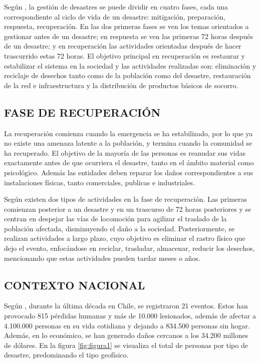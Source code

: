 \documentclass[12pt,a4paper]{article}
\begin{document}
Según \citet{celik}, la gestión de desastres se puede dividir en cuatro fases, cada una correspondiente al ciclo de vida de un desastre: mitigación, preparación, respuesta, recuperación. En las dos primeras fases se ven los temas orientados a gestionar antes de un desastre; en respuesta se ven las primeras 72 horas después de un desastre; y en recuperación las actividades orientadas después de hacer trascurrido estas 72 horas. El objetivo principal en recuperación es restaurar y estabilizar el sistema en la sociedad y las actividades realizadas son: eliminación y reciclaje de desechos tanto como de la población como del desastre, restauración de la red e infraestructura y la distribución de productos básicos de socorro.

\subsection{FASE DE RECUPERACIÓN}

La recuperación comienza cuando la emergencia se ha estabilizado, por lo que ya no existe una amenaza latente a la población, y termina cuando la comunidad se ha recuperado. El objetivo de la mayoría de las personas es reanudar sus vidas exactamente antes de que ocurriera el desastre, tanto en el ámbito material como psicológico. Además las entidades deben reparar los daños correspondientes a sus instalaciones físicas, tanto comerciales, publicas e industriales\citep{lindell2006wiley}.

Según \citet{Feng2003} existen dos tipos de actividades en la fase de recuperación. Las primeras comienzan posterior a un desastre y en un trascurso de 72 horas posteriores y se centran en despejar las vías de locomoción para agilizar el traslado de la población afectada, disminuyendo el daño a la sociedad. Posteriormente, se realizan actividades a largo plazo, cuyo objetivo es eliminar el rastro físico que dejo el evento, enfocándose en reciclar, trasladar, almacenar, reducir los desechos, mencionando que estas actividades pueden tardar meses o años.

\subsection{CONTEXTO NACIONAL}

Según \citep{emdat}, durante la última década en Chile, se registraron 21 eventos. Estos han provocado 815 pérdidas humanas y más de 10.000 lesionados, además de afectar a 4.100.000 personas en su vida cotidiana y dejando a 834.500 personas sin hogar. Además, en lo económico, se han generado daños cercanos a los 34.200 millones de dólares. En la figura \ref{fig:figura1} se visualiza el total de personas por tipo de desastre, predominando el tipo geofísico.
\end{document}
